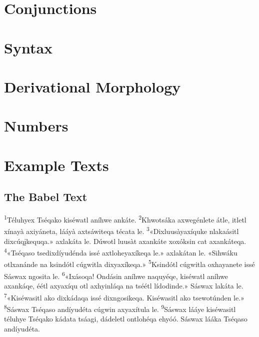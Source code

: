 \documentclass[11pt,a4paper,titlepage]{article}
\begin{document}
	\section{Conjunctions}
		\lipsum[1]
	\section{Syntax}
		\lipsum[1]
	\section{Derivational Morphology}
		\lipsum[1]
	\section{Numbers}
		\lipsum[1]
	\section{Example Texts}
		\subsection{The Babel Text}
			\textsuperscript{1}Téluhyex Tséqako kiséwatl aníhwe ankáte.
			\textsuperscript{2}Khwotsáka axwegénlete \'atle, itletl xínay\`a axiy\'aneta, lááy\`a axtsáwiteqa técata le.
			\textsuperscript{3}«Dixluusàyaxíquke nlakaásitl dixcúqįkequqa.» axlakáta le. Dúwotl luusàt axankáte xoxóksin cat axankáteqa.
			\textsuperscript{4}«Tséqaso tsedixdíyudénda issé axtloheyaxíkeqa le.» axlakátan le. «Sihwáku otlxanánde na ksindótl cúgwitla dixyaxíkeqa.»
			\textsuperscript{5}Ksindótl cúgwitla oxhayanete issé Sáswax ngosita le.
			\textsuperscript{6}«Ixásoqa! Ondásin aníhwe naquyéqe, kiséwatl aníhwe axankáqe, éétl axyaxíqu otl axhyinláqa na tséétl lídodinde.» Sáswax lakáta le.
			\textsuperscript{7}«Kiséwasitl ako dixkádaqa issé dixngosikeqa. Kiséwasitl ako tsewotúnden le.»
			\textsuperscript{8}Sáswax Tséqaso andíyudéta cúgwin axyaxítula le.
			\textsuperscript{9}Sáswax lááye kiséwasitl téluhye Tséqako kádata tsáagi, dádeletl ontlohéqa ehyóó. Sáswax lááka Tséqaso andíyudéta.
			\\~
			
			
			\vspace{12pt}
			
			\vspace{12pt}
			
			\vspace{12pt}
\end{document}
